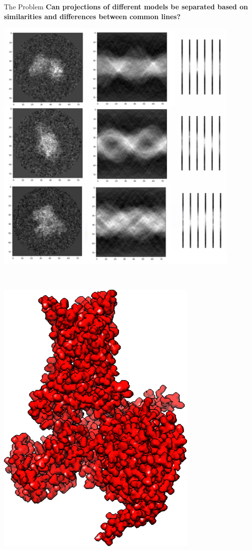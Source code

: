 \documentclass[t, 11pt, xcolor=dvipsnames]{beamer}
\begin{document}
\begin{frame}{The Problem}
  \textbf{Can projections of different models be separated based on similarities and differences between common lines?}
  \begin{center}
    \begin{minipage}{0.45\textwidth}
      \includegraphics[width=0.9\textwidth]{images/proj_sin_lin.png}
    \end{minipage}
    ~
    \begin{minipage}{0.45\textwidth}
      \begin{center}
        \includegraphics[height=0.4\textheight]{images/figures/no_e.png}

\end{center}
\end{minipage}
\end{center}
\end{frame}
\end{document}
